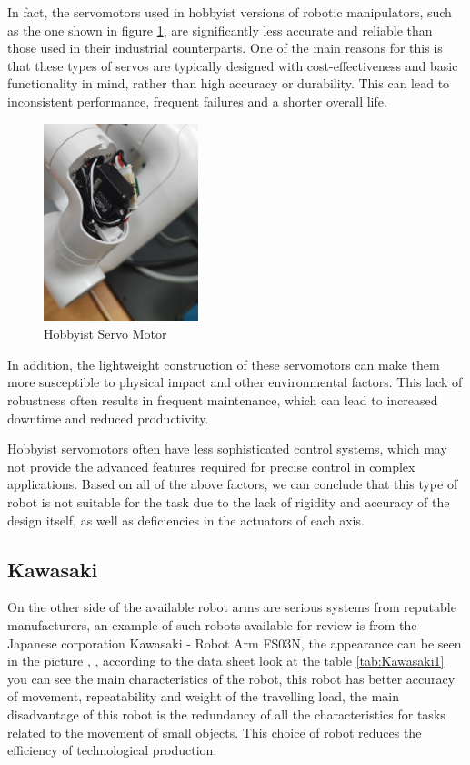 In fact, the servomotors used in hobbyist versions of robotic manipulators, such as the one shown in figure \ref{mycobot3}, are significantly less accurate and reliable than those used in their industrial counterparts. One of the main reasons for this is that these types of servos are typically designed with cost-effectiveness and basic functionality in mind, rather than high accuracy or durability. This can lead to inconsistent performance, frequent failures and a shorter overall life.


\begin{figure}[H]
	\centering
	\includegraphics[width=0.4\textwidth]{Src/images/mycobot3.png}
	\caption{Hobbyist Servo Motor}
    \label{mycobot3}
\end{figure}


In addition, the lightweight construction of these servomotors can make them more susceptible to physical impact and other environmental factors. This lack of robustness often results in frequent maintenance, which can lead to increased downtime and reduced productivity.

Hobbyist servomotors often have less sophisticated control systems, which may not provide the advanced features required for precise control in complex applications. 
Based on all of the above factors, we can conclude that this type of robot is not suitable for the task due to the lack of rigidity and accuracy of the design itself, as well as deficiencies in the actuators of each axis.

\subsection*{Kawasaki}

On the other side of the available robot arms are serious systems from reputable manufacturers, an example of such robots available for review is from the Japanese corporation Kawasaki - Robot Arm FS03N, the appearance can be seen in the picture {}, , according to the data sheet look at the table \ref{tab:Kawasaki1} you can see the main characteristics of the robot, this robot has better accuracy of movement, repeatability and weight of the travelling load, the main disadvantage of this robot is the redundancy of all the characteristics for tasks related to the movement of small objects. This choice of robot reduces the efficiency of technological production.


